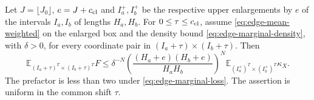 \begin{proposition}\label{prop:edge-box-deficit}
Let \(J=\lfloor J_0\rfloor\), \(e=J+c_{\rm cl}\) and
\(I_a^+,I_b^+\) be the respective upper enlargements by \(e\)
of the intervals \(I_a,I_b\) of lengths \(H_a,H_b\).
For \(0\le\tau\le c_{\rm cl}\), assume
\eqref{eq:edge-mean-weighted} on the enlarged box and the density
bound \eqref{eq:edge-marginal-density}, with \(\delta>0\), for every
coordinate pair in \((I_a+\tau)\times(I_b+\tau)\). Then
\[
 \mathbb E_{(I_a+\tau)^T\times(I_b+\tau)^T}F
 \le \delta^{-N}
    \left(\frac{(H_a+e)(H_b+e)}{H_aH_b}\right)^N
       \mathbb E_{(I_a^+)^T\times(I_b^+)^T}\kappa_X .
\]
The prefactor is less than two under \eqref{eq:edge-marginal-loss}. The assertion is uniform in the common shift \(\tau\).
\end{proposition}

